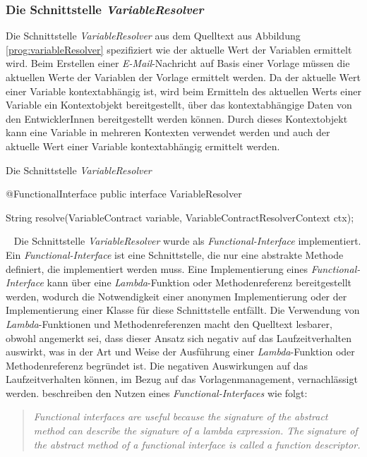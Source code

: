 \subsubsection{Die Schnittstelle \emph{VariableResolver}}
\label{sec:variableResolver}
Die Schnittstelle \emph{VariableResolver} aus dem Quelltext aus Abbildung \ref{prog:variableResolver} spezifiziert wie der aktuelle Wert der Variablen ermittelt wird. Beim Erstellen einer \emph{E-Mail}-Nachricht auf Basis einer Vorlage müssen die aktuellen Werte der Variablen der Vorlage ermittelt werden. 
Da der aktuelle Wert einer Variable kontextabhängig ist, wird beim Ermitteln des aktuellen Werts einer Variable ein Kontextobjekt bereitgestellt, über das kontextabhängige Daten von den  EntwicklerInnen bereitgestellt werden können. Durch dieses Kontextobjekt kann eine Variable in mehreren Kontexten verwendet werden und auch der aktuelle Wert einer Variable kontextabhängig ermittelt werden.
\begin{program}[h]
\caption{Die Schnittstelle \emph{VariableResolver}}
\label{prog:variableResolver}
\begin{JavaCode}
@FunctionalInterface
public interface VariableResolver {

    String resolve(VariableContract variable,
                   VariableContractResolverContext ctx);
}
\end{JavaCode}
\end{program}
\ \newline
Die Schnittstelle \emph{VariableResolver} wurde als \emph{Functional-Interface} implementiert. Ein \emph{Functional-Interface} ist eine Schnittstelle, die nur eine abstrakte Methode definiert, die implementiert werden muss. Eine Implementierung eines \emph{Functional-Interface} kann über eine \emph{Lambda}-Funktion oder Methodenreferenz bereitgestellt werden, wodurch die Notwendigkeit einer anonymen Implementierung oder der Implementierung einer Klasse für diese Schnittstelle entfällt. Die Verwendung von \emph{Lambda}-Funktionen und Methodenreferenzen macht den Quelltext lesbarer, obwohl angemerkt sei, dass dieser Ansatz sich negativ auf das Laufzeitverhalten auswirkt, was in der Art und Weise der Ausführung einer \emph{Lambda}-Funktion oder Methodenreferenz begründet ist. Die negativen Auswirkungen auf das Laufzeitverhalten können, im Bezug auf das Vorlagenmanagement, vernachlässigt werden. \cite[50]{java8InAction} beschreiben den Nutzen eines \emph{Functional-Interfaces} wie folgt:
\begin{quote}
\emph{Functional interfaces are useful because the signature of the abstract method can describe the signature of a lambda expression. The signature of the abstract method of a functional interface is called a function descriptor.}
\end{quote}

